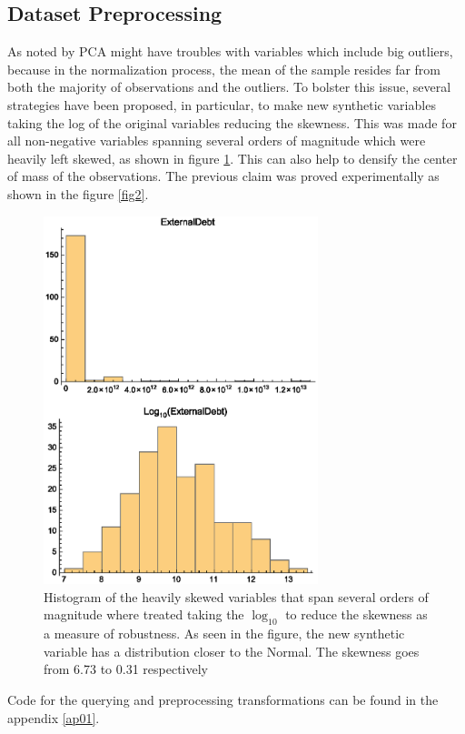 \documentclass[a4paper,10pt,twocolumn]{article}
\begin{document}
\subsection{Dataset Preprocessing}
As noted by \cite{Huang2009} PCA might have troubles with variables which include big outliers, because in the normalization process, the mean of the sample resides far from both the majority of observations and the outliers. To bolster this issue, several strategies have been proposed, in particular, to make new synthetic variables taking the log of the original variables reducing the skewness. This was made for all non-negative variables spanning several orders of magnitude which were heavily left skewed, as shown in figure \ref{fig1}. This can also help to densify the center of mass of the observations. The previous claim was proved experimentally as shown in the figure \ref{fig2}. 
\begin{figure}[!ht]
\begin{center}
\includegraphics[width=8cm]{f1.eps}
\caption{\footnotesize{Histogram of the heavily skewed variables that span several orders of magnitude where treated taking the $\log_{10}$ to reduce the skewness as a measure of robustness. As seen in the figure, the new synthetic variable has a distribution closer to the Normal. The skewness goes from 6.73 to 0.31 respectively}\label{fig1}}
\end{center}
\end{figure}

Code for the querying and preprocessing transformations can be found in the appendix \ref{ap01}.
\end{document}
